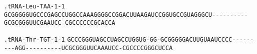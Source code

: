 \documentclass{article}
\newcommand{\rnabox}[1]{\colorbox{#1}{\texttt{#1}}}
\begin{document}
\vspace{-0.5mm}

\texttt{.tRNA-Leu-TAA-1-1}
\rnabox{G}\rnabox{C}\rnabox{G}\rnabox{G}\rnabox{G}\rnabox{G}\rnabox{G}\rnabox{U}\rnabox{G}\rnabox{C}\rnabox{C}\rnabox{C}\rnabox{G}\rnabox{A}\rnabox{G}\rnabox{C}\rnabox{C}\rnabox{U}\rnabox{G}\rnabox{G}\rnabox{C}\rnabox{C}\rnabox{A}\rnabox{A}\rnabox{A}\rnabox{G}\rnabox{G}\rnabox{G}\rnabox{G}\rnabox{C}\rnabox{C}\rnabox{G}\rnabox{G}\rnabox{A}\rnabox{C}\rnabox{U}\rnabox{U}\rnabox{A}\rnabox{A}\rnabox{G}\rnabox{A}\rnabox{U}\rnabox{C}\rnabox{C}\rnabox{G}\rnabox{G}\rnabox{U}\rnabox{G}\rnabox{C}\rnabox{C}\rnabox{G}\rnabox{U}\rnabox{A}\rnabox{G}\rnabox{G}\rnabox{G}\rnabox{C}\rnabox{U}\rnabox{-}\rnabox{-}\rnabox{-}\rnabox{-}\rnabox{-}\rnabox{-}\rnabox{-}\rnabox{-}\rnabox{-}\rnabox{-}\rnabox{G}\rnabox{C}\rnabox{G}\rnabox{C}\rnabox{G}\rnabox{G}\rnabox{G}\rnabox{U}\rnabox{U}\rnabox{C}\rnabox{G}\rnabox{A}\rnabox{A}\rnabox{U}\rnabox{C}\rnabox{C}\rnabox{-}\rnabox{C}\rnabox{G}\rnabox{C}\rnabox{C}\rnabox{C}\rnabox{C}\rnabox{C}\rnabox{C}\rnabox{G}\rnabox{C}\rnabox{A}\rnabox{C}\rnabox{C}\rnabox{A}

\vspace{-0.5mm}

\texttt{.tRNA-Thr-TGT-1-1}
\rnabox{G}\rnabox{C}\rnabox{C}\rnabox{C}\rnabox{G}\rnabox{G}\rnabox{G}\rnabox{U}\rnabox{A}\rnabox{G}\rnabox{C}\rnabox{C}\rnabox{U}\rnabox{A}\rnabox{G}\rnabox{C}\rnabox{C}\rnabox{U}\rnabox{G}\rnabox{G}\rnabox{U}\rnabox{G}\rnabox{-}\rnabox{G}\rnabox{G}\rnabox{-}\rnabox{G}\rnabox{C}\rnabox{G}\rnabox{G}\rnabox{G}\rnabox{G}\rnabox{G}\rnabox{A}\rnabox{C}\rnabox{U}\rnabox{U}\rnabox{G}\rnabox{U}\rnabox{A}\rnabox{A}\rnabox{U}\rnabox{C}\rnabox{C}\rnabox{C}\rnabox{C}\rnabox{-}\rnabox{-}\rnabox{-}\rnabox{-}\rnabox{-}\rnabox{-}\rnabox{-}\rnabox{-}\rnabox{-}\rnabox{A}\rnabox{G}\rnabox{G}\rnabox{-}\rnabox{-}\rnabox{-}\rnabox{-}\rnabox{-}\rnabox{-}\rnabox{-}\rnabox{-}\rnabox{-}\rnabox{-}\rnabox{U}\rnabox{C}\rnabox{G}\rnabox{C}\rnabox{G}\rnabox{G}\rnabox{G}\rnabox{U}\rnabox{U}\rnabox{C}\rnabox{A}\rnabox{A}\rnabox{A}\rnabox{U}\rnabox{C}\rnabox{C}\rnabox{-}\rnabox{C}\rnabox{G}\rnabox{C}\rnabox{C}\rnabox{C}\rnabox{C}\rnabox{G}\rnabox{G}\rnabox{G}\rnabox{C}\rnabox{U}\rnabox{C}\rnabox{C}\rnabox{A}

\vspace{-0.5mm}
\end{document}
